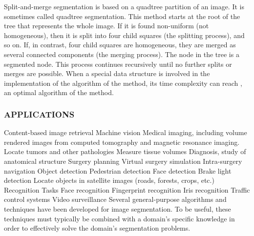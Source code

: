 Split-and-merge segmentation is based on a quadtree partition of an image. It is sometimes called quadtree segmentation.
This method starts at the root of the tree that represents the whole image. If it is found non-uniform (not homogeneous), then it is split into four child squares (the splitting process), and so on. If, in contrast, four child squares are homogeneous, they are merged as several connected components (the merging process). The node in the tree is a segmented node. This process continues recursively until no further splits or merges are possible. When a special data structure is involved in the implementation of the algorithm of the method, its time complexity can reach , an optimal algorithm of the method.

\subsubsection{APPLICATIONS}
Content-based image retrieval
Machine vision
Medical imaging, including volume rendered images from computed tomography and magnetic resonance imaging.
Locate tumors and other pathologies
Measure tissue volumes
Diagnosis, study of anatomical structure
Surgery planning
Virtual surgery simulation
Intra-surgery navigation
Object detection
Pedestrian detection
Face detection
Brake light detection
Locate objects in satellite images (roads, forests, crops, etc.)
Recognition Tasks
Face recognition
Fingerprint recognition
Iris recognition
Traffic control systems
Video surveillance
Several general-purpose algorithms and techniques have been developed for image segmentation. To be useful, these techniques must typically be combined with a domain's specific knowledge in order to effectively solve the domain's segmentation problems.

